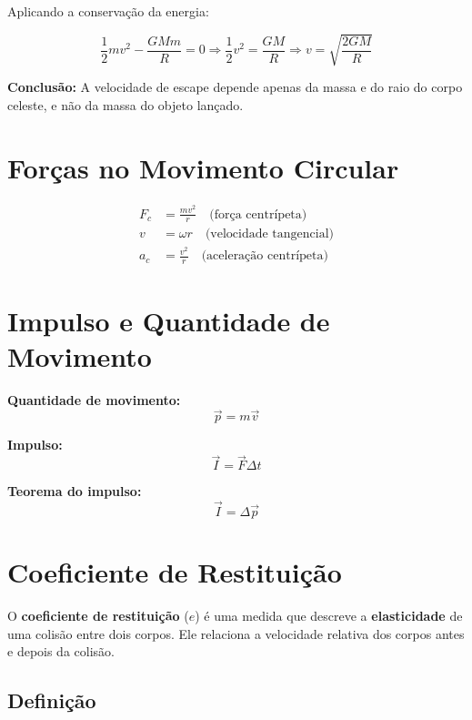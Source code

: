 \documentclass[a4paper,12pt]{article}
\begin{document}
\begin{multicols}{2}
Aplicando a conservação da energia:

\[
\frac{1}{2}mv^2 - \frac{GMm}{R} = 0
\Rightarrow \frac{1}{2}v^2 = \frac{GM}{R}
\Rightarrow v = \sqrt{\frac{2GM}{R}}
\]

\noindent
\textbf{Conclusão:} A velocidade de escape depende apenas da massa e do raio do corpo celeste, e não da massa do objeto lançado.

\section{Forças no Movimento Circular}

\begin{align*}
  F_c &= \frac{m v^2}{r} \quad \text{(força centrípeta)} \\
  v &= \omega r \quad \text{(velocidade tangencial)} \\
  a_c &= \frac{v^2}{r} \quad \text{(aceleração centrípeta)}
\end{align*}

\section{Impulso e Quantidade de Movimento}

\textbf{Quantidade de movimento:}
\begin{equation*}
  \vec{p} = m \vec{v}
\end{equation*}

\textbf{Impulso:}
\begin{equation*}
  \vec{I} = \vec{F} \Delta t
\end{equation*}

\textbf{Teorema do impulso:}
\begin{equation*}
  \vec{I} = \Delta \vec{p}
\end{equation*}

\section{Coeficiente de Restituição}

O \textbf{coeficiente de restituição} (\( e \)) é uma medida que descreve a \textbf{elasticidade} de uma colisão entre dois corpos. Ele relaciona a velocidade relativa dos corpos antes e depois da colisão.

\subsection{Definição}


\end{multicols}
\end{document}
